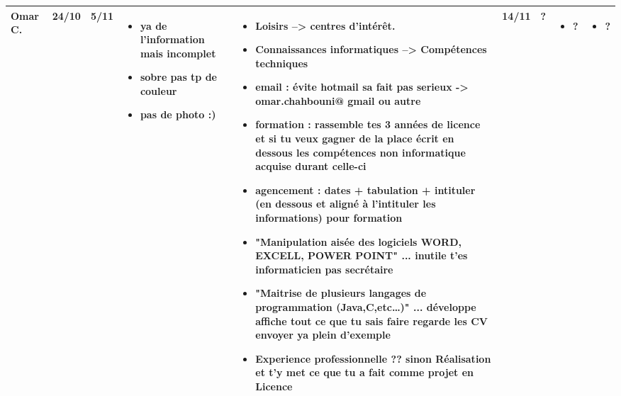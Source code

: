 \documentclass[a4paper,11pt]{article}
\begin{document}
\begin{landscape}
\begin{longtable}{|l|l|l|p{4cm}|p{4cm}|l|l|p{4cm}|p{4cm}|}
    Omar C. & 24/10 & 5/11 %
			& \begin{itemize}
			  \item ya de l'information mais incomplet
			  \item sobre pas tp de couleur
			  \item pas de photo :)
			  \end{itemize}
			& \begin{itemize}
			  \item Loisirs --> centres d'intérêt.
			  \item Connaissances informatiques --> Compétences techniques
			  \item email : évite hotmail sa fait pas serieux -> omar.chahbouni@ gmail ou autre
			  \item formation : rassemble tes 3 années de licence et si tu veux gagner de la place écrit en dessous les compétences non informatique acquise durant celle-ci
			  \item agencement  : dates  + tabulation + intituler (en dessous et aligné à l'intituler les informations) pour formation
			  \item "Manipulation aisée des logiciels WORD, EXCELL, POWER POINT" ... inutile t'es informaticien pas secrétaire
			  \item "Maitrise de plusieurs langages de programmation (Java,C,etc…)" ... développe affiche tout ce que tu sais faire regarde les CV envoyer ya plein d'exemple
			  \item Experience professionnelle ?? sinon Réalisation et t'y met ce que tu a fait comme projet en Licence
			  \end{itemize}
			& 14/11 & ?
			& \begin{itemize}
			  \item ?
			  \end{itemize}
			& \begin{itemize}
			  \item ?
			  \end{itemize} \\ \hline


\end{longtable}
\end{landscape}
\end{document}
